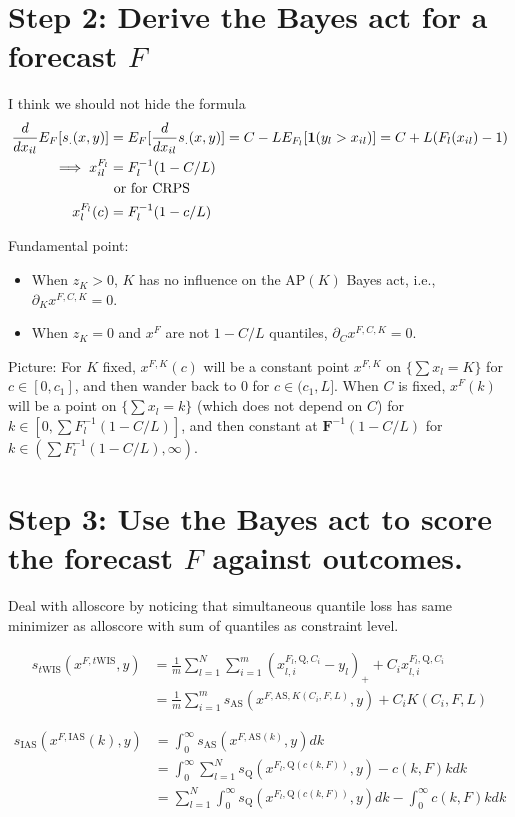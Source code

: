 \documentclass{article}
\begin{document}
\section{Step 2: Derive the Bayes act for a forecast $F$}

I think we should not hide the formula 
\begin{align}
\frac{d {} }{d {x_{il}}} E_F[s_{.}(x,y)] &= E_{F}[\frac{d {} }{d {x_{il}}} s_{.}(x,y)] = C - LE_{F_l}[\mathbf{1}(y_l > x_{il})] = C + L(F_l(x_{il}) - 1) \\
\implies x_{il}^{F_l} &= F_l^{-1}(1 - C/L) \\
&\text{ or for CRPS} \\
x_{l}^{F_l}(c) &= F_l^{-1}(1 - c/L)
\end{align}

Fundamental point: 
\begin{itemize}
\item When $z_K > 0$, $K$ has no influence on the $\mathrm{AP}(K)$ Bayes act, i.e., $\partial_K x^{F,C,K} = 0$.  
\item When $z_K=0$ and $x^F$ are not $1-C/L$ quantiles, $\partial_C x^{F,C,K} = 0$.
\end{itemize}

Picture: For $K$ fixed, $x^{F,K}(c)$ will be a constant point $x^{F,K}$ on $\{\sum x_l = K\}$ for $c \in [0, c_1]$, 
and then wander back to 0 for $c \in (c_1,L]$. When $C$ is fixed, $x^{F}(k)$ will be a point on $\{\sum x_l = k\}$ (which does not depend on $C$)
for $k \in [0, \sum F_l^{-1}(1-C/L)]$, and then constant at $\mathbf{F}^{-1}(1-C/L)$ for $k \in (\sum F_l^{-1}(1-C/L), \infty)$.

\section{Step 3: Use the Bayes act to score the forecast $F$ against outcomes.}

Deal with alloscore by noticing that simultaneous quantile loss has same minimizer as alloscore with sum of quantiles as constraint level.

\begin{align}
s_{t\mathrm{WIS}}(x^{F,t\mathrm{WIS}},y) &= \frac{1}{m}\sum_{l=1}^N \sum_{i=1}^{m}(x_{l,i}^{F_l,\mathrm{Q}, C_i}- y_l)_+  + C_i x_{l,i}^{F_l,\mathrm{Q}, C_i}\\ 
&= \frac{1}{m} \sum_{i=1}^{m}s_{\mathrm{AS}}(x^{F,\mathrm{AS},  K(C_i, F, L)},y) + C_i K(C_i, F, L)
\end{align}

\begin{align}
s_{\mathrm{IAS}}(x^{F, \mathrm{IAS}}(k), y) &= \int_0^{\infty} s_{\mathrm{AS}}(x^{F, \mathrm{AS}(k)}, y) dk \\
&= \int_0^{\infty} \sum_{l=1}^N s_{\mathrm{Q}}(x^{F_l, \mathrm{Q}(c(k, F))}, y) - c(k, F)kdk \\
&= \sum_{l=1}^N \int_0^{\infty} s_{\mathrm{Q}}(x^{F_l, \mathrm{Q}(c(k, F))}, y) dk -  \int_0^{\infty} c(k, F)kdk
\end{align}
\end{document}
